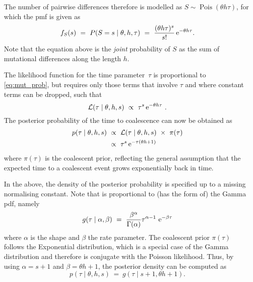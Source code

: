 The number of pairwise differences therefore is modelled as ${S \sim \operatorname{Pois}(\theta h \tau)}$, for which the \gls{pmf} is given as
\begin{equation}\label{eq:mut_prob}
	f_S(s)~=~P(S=s \mid \theta,h,\tau) ~=~ \frac{(\theta h \tau)^s}{s!} \,\mathrm{e}^{-\theta h \tau}\text{.}
\end{equation}
Note that the equation above is the \emph{joint} probability of $S$ as the sum of mutational differences along the length $h$.

The likelihood function for the time parameter~$\tau$ is proportional to \cref{eq:mut_prob}, but requires only those terms that involve $\tau$ and where constant terms can be dropped, such that
\begin{equation}\label{eq:mut_like}
	\mathcal{L}(\tau \mid \theta,h,s) ~\propto~ \tau^s \,\mathrm{e}^{-\theta h \tau}\ .
\end{equation}
The posterior probability of the time to coalescence can now be obtained as
\begin{equation}\label{eq:mut_post}
\begin{split}
	p(\tau \mid \theta,h,s)
	&~\propto~ \mathcal{L}(\tau \mid \theta,h,s)~\times~\pi(\tau) \\
	&~\propto~ \tau^s \,\mathrm{e}^{- \tau (\theta h +1)}
\end{split}
\end{equation}
where $\pi(\tau)$ is the coalescent prior, reflecting the general assumption that the expected time to a coalescent event grows exponentially back in time.

In the above, the density of the posterior probability is specified up to a missing normalising constant.
Note that  is proportional to (has the form of) the Gamma \gls{pdf}, namely
\begin{equation*}
	g(\tau\mid\alpha,\beta)~=~\frac{\beta^\alpha}{\Gamma(\alpha)}\tau^{\alpha - 1}\,\,\mathrm{e}^{-\beta\tau}
\end{equation*}
where $\alpha$ is the shape and $\beta$ the rate parameter.
The coalescent prior $\pi(\tau)$ follows the Exponential distribution, which is a special case of the Gamma distribution and therefore is conjugate with the Poisson likelihood.
Thus, by using ${\alpha = s+1}$ and ${\beta = \theta h+1}$, the posterior density can be computed as
\begin{equation}
	p(\tau \mid \theta,h,s)~=~g(\tau\mid s+1, \theta h+1)\text{.}
\end{equation}




